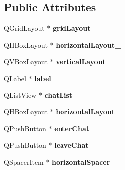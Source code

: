 \subsection*{Public Attributes}
\begin{DoxyCompactItemize}
\item 
Q\+Grid\+Layout $\ast$ {\bfseries grid\+Layout}\hypertarget{classUi__MessageGUI_abe385fd3a460f0565f9322b8b87625bf}{}\label{classUi__MessageGUI_abe385fd3a460f0565f9322b8b87625bf}

\item 
Q\+H\+Box\+Layout $\ast$ {\bfseries horizontal\+Layout\+\_}\hypertarget{classUi__MessageGUI_a2ff9102f7fc047b0b936318839101227}{}\label{classUi__MessageGUI_a2ff9102f7fc047b0b936318839101227}

\item 
Q\+V\+Box\+Layout $\ast$ {\bfseries vertical\+Layout}\hypertarget{classUi__MessageGUI_a5d1c6290b3ed2408f669785c0fff8944}{}\label{classUi__MessageGUI_a5d1c6290b3ed2408f669785c0fff8944}

\item 
Q\+Label $\ast$ {\bfseries label}\hypertarget{classUi__MessageGUI_a88159dd8906e694ffef60994e865da83}{}\label{classUi__MessageGUI_a88159dd8906e694ffef60994e865da83}

\item 
Q\+List\+View $\ast$ {\bfseries chat\+List}\hypertarget{classUi__MessageGUI_a53b6296a9682a45244c27eeee949bbbc}{}\label{classUi__MessageGUI_a53b6296a9682a45244c27eeee949bbbc}

\item 
Q\+H\+Box\+Layout $\ast$ {\bfseries horizontal\+Layout}\hypertarget{classUi__MessageGUI_a245074811743346b87ec5bfce94bf96d}{}\label{classUi__MessageGUI_a245074811743346b87ec5bfce94bf96d}

\item 
Q\+Push\+Button $\ast$ {\bfseries enter\+Chat}\hypertarget{classUi__MessageGUI_a30cfc305daf7fecc6e8f2b25a69e458c}{}\label{classUi__MessageGUI_a30cfc305daf7fecc6e8f2b25a69e458c}

\item 
Q\+Push\+Button $\ast$ {\bfseries leave\+Chat}\hypertarget{classUi__MessageGUI_a1cfe2a26f94582fd1d59473f492361aa}{}\label{classUi__MessageGUI_a1cfe2a26f94582fd1d59473f492361aa}

\item 
Q\+Spacer\+Item $\ast$ {\bfseries horizontal\+Spacer}\hypertarget{classUi__MessageGUI_a0e9b93fed2c5099b94f7c9df3acbcd9e}{}\label{classUi__MessageGUI_a0e9b93fed2c5099b94f7c9df3acbcd9e}


\end{DoxyCompactItemize}

